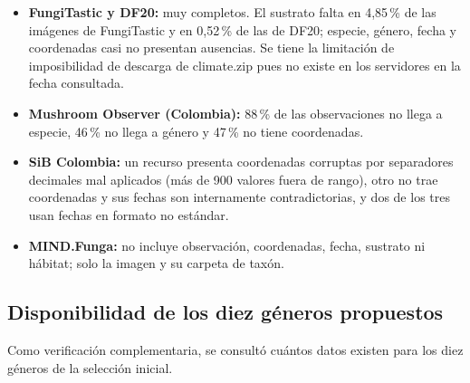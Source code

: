 \documentclass[11pt,a4paper]{article}
\begin{document}
\begin{itemize}
    \item \textbf{FungiTastic y DF20:} muy completos. El sustrato falta en 4,85\,\%
    de las imágenes de FungiTastic y en 0,52\,\% de las de DF20; especie, género,
    fecha y coordenadas casi no presentan ausencias. Se tiene la limitación de imposibilidad de descarga de climate.zip pues no existe en los servidores en la fecha consultada.
    \item \textbf{Mushroom Observer (Colombia):} 88\,\% de las observaciones no
    llega a especie, 46\,\% no llega a género y 47\,\% no tiene coordenadas.
    \item \textbf{SiB Colombia:} un recurso presenta coordenadas corruptas por
    separadores decimales mal aplicados (más de 900 valores fuera de rango), otro
    no trae coordenadas y sus fechas son internamente contradictorias, y dos de
    los tres usan fechas en formato no estándar.
    \item \textbf{MIND.Funga:} no incluye observación, coordenadas, fecha,
    sustrato ni hábitat; solo la imagen y su carpeta de taxón.
\end{itemize}


\subsection{Disponibilidad de los diez géneros propuestos}

Como verificación complementaria, se consultó cuántos datos existen para los
diez géneros de la selección inicial.
\end{document}
